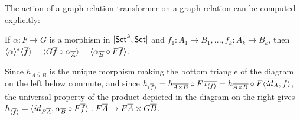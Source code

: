 \documentclass{lmcs}
\theoremstyle{plain}\newtheorem{satz}[thm]{Satz}
\newcommand{\set}{\mathsf{Set}}
\renewcommand{\id}{\mathit{id}}
\begin{document}
{\begin{comment}
We also note that if $f : A \to B$ is a function seen as a natural
transformation between 0-ary functors, then $\graph{f}$ is (the 0-ary
relation transformer associated with) the graph relation of $f$.
Indeed, we need to apply Definition~\ref{dfn:graph-nat-transf} with $k
= 0$, i.e., to the degenerate relation $\ast : \rel(\ast, \ast)$.  As
degenerate $0$-ary functors, $A$ and $B$ are constant functors, i.e.,
$A\, \ast = A$ and $B\, \ast = B$.  By the universal property of the
product, there exists a unique $h$ making the diagram
\[ \begin{tikzcd}[row sep = large]
        A
        &A
        \ar[l, equal]
        \ar[r, equal]
        \ar[d, dashed, "{h}"]
        &A
        \ar[r, "{f}"]
        &B \\
        &A \times B
        \ar[ul, "{\pi_1}"] \ar[urr, "{\pi_2}"']
\end{tikzcd}\]
commute. Since $\iota_\ast : \ast \to \ast$ is the identity on $\ast$,
and $A\, \id_{\ast} = \id_{A}$, we have $h_{\ast} = h$.  Moreover,
$h_{\overline{A \times B}} = \langle \id_{A}, f \rangle$ is a
monomorphism in $\set$ because $\id_{A}$ is.  Then,
$\iota_{f^\wedge\ast} = \langle \id_{A}, f \rangle$ and $f^\wedge\ast
= A$, from which we deduce that $\iota_{f^\wedge\ast} f^\wedge\ast =
\langle \id_{A}, f \rangle\, A = \graph{f}^*$. This ensures that the
graph of $f$ as a 0-ary natural transformation coincides with the
graph of $f$ as a morphism in $\set$, and so that
Definition~\ref{dfn:graph-nat-transf} is a reasonable generalization
of Definition~\ref{def:graph}.

Just as the equality relation $\Eq_B$ on a set $B$ coincides with
$\graph{\id_B}$, the graph of the identity on the set, so we can
define the equality relation transformer to be the graph of the
identity natural transformation. This gives

\begin{defi}
Let $F : [\set^k, \set]$.  The equality relation transformer on $F$ is
defined to be $\Eq_F = \graph{\id_{F}}$. This entails that $Eq_F = (F,
F, \Eq_F^*)$ with $\Eq_F^* = \graph{\id_{F}}^*$.
\end{defi}
\end{comment}

The action of a graph relation transformer on a graph relation can be
computed explicitly:  

\begin{lem}\label{lem:eq-reln-equalities}
If $\alpha : F \to G$ is a morphism in $[\mathsf{Set}^k, \mathsf{Set}]$
and $f_1: A_1 \to B_1, ..., f_k : A_k \to B_k$,
then $\langle {\alpha} \rangle^* \langle {\overline{f}} \rangle
= \langle G \overline{f} \circ \alpha_{\overline{A}} \rangle
= \langle \alpha_{\overline{B}} \circ F \overline{f} \rangle$.
\end{lem}
\proof
Since $h_{\overline{A \times B}}$ is the unique morphism making the
bottom triangle of the diagram on the left below commute, and since
$h_{\graph{\overline{f}}} = h_{\overline{A \times B}} \circ F
\,\ol{\iota_{\graph{f}}} = h_{\overline{A \times B}} \circ F
\overline{\langle \id_A, f \rangle}$, the universal property of the
product depicted in the diagram on the right gives
$h_{\graph{\overline{f}}} = \langle \id_{F \ol{A}}, \alpha_{\ol{B}}
\circ F\ol{f} \rangle : F \ol{A} \to F \ol{A} \times G \ol{B}$.

}
\end{document}
